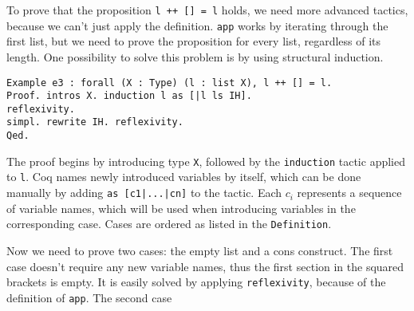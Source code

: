 \documentclass{scrreprt}
\newcommand{\todo}[1]{\marginpar{\textbf{TODO:} #1}}
\begin{document}
\par
To prove that the proposition \texttt{l ++ [] = l} holds, we need more advanced tactics, because we can't just apply the definition. \texttt{app} works by iterating through the first list, but we need to prove the proposition for every list, regardless of its length. One possibility to solve this problem is by using structural induction.
\begin{verbatim}
Example e3 : forall (X : Type) (l : list X), l ++ [] = l.
Proof. intros X. induction l as [|l ls IH].
reflexivity.
simpl. rewrite IH. reflexivity.
Qed.
\end{verbatim}
The proof begins by introducing type \texttt{X}, followed by the \texttt{induction} tactic applied to \texttt{l}. Coq names newly introduced variables by itself, which can be done manually by adding \texttt{as [c1|...|cn]} to the tactic. Each $c_{i}$ represents a sequence of variable names, which will be used when introducing variables in the corresponding case. Cases are ordered as listed in the \texttt{Definition}.
\par
Now we need to prove two cases: the empty list and a cons construct. The first case doesn't require any new variable names, thus the first section in the squared brackets is empty. It is easily solved by applying \texttt{reflexivity}, because of the definition of \texttt{app}.
The second case 
 

\appendix



\end{document}
